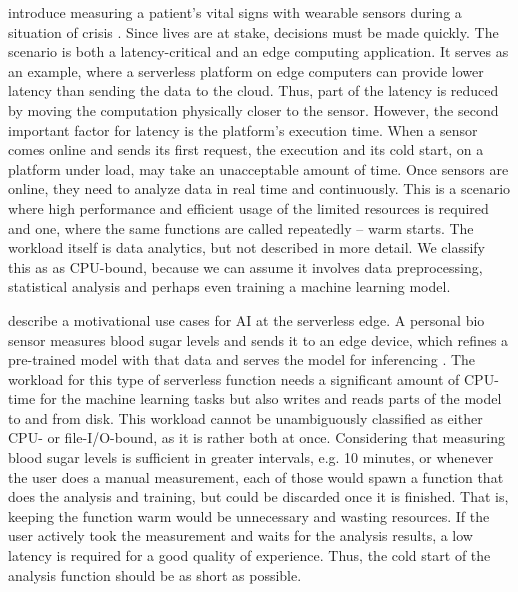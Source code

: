 

\begin{description}[style=multiline, leftmargin=2.5cm, font=\bfseries]

    \item[Vital Signs Analysis] \citeauthor{Nastic2017} introduce measuring a patient's vital signs with wearable sensors during a situation of crisis \cite{Nastic2017}. Since lives are at stake, decisions must be made quickly. The scenario is both a latency-critical and an edge computing application. It serves as an example, where a serverless platform on edge computers can provide lower latency than sending the data to the cloud. Thus, part of the latency is reduced by moving the computation physically closer to the sensor. However, the second important factor for latency is the platform's execution time. When a sensor comes online and sends its first request, the execution and its cold start, on a platform under load, may take an unacceptable amount of time. Once sensors are online, they need to analyze data in real time and continuously. This is a scenario where high performance and efficient usage of the limited resources is required and one, where the same functions are called repeatedly -- warm starts.
    The workload itself is data analytics, but not described in more detail. We classify this as as CPU-bound, because we can assume it involves data preprocessing, statistical analysis and perhaps even training a machine learning model.

    \item[Edge AI] \citeauthor{Rausch2019} describe a motivational use cases for AI at the serverless edge. A personal bio sensor measures blood sugar levels and sends it to an edge device, which refines a pre-trained model with that data and serves the model for inferencing \cite{Rausch2019}. The workload for this type of serverless function needs a significant amount of CPU-time for the machine learning tasks but also writes and reads parts of the model to and from disk. This workload cannot be unambiguously classified as either CPU- or file-I/O-bound, as it is rather both at once. Considering that measuring blood sugar levels is sufficient in greater intervals, e.g. 10 minutes, or whenever the user does a manual measurement, each of those would spawn a function that does the analysis and training, but could be discarded once it is finished. That is, keeping the function warm would be unnecessary and wasting resources. If the user actively took the measurement and waits for the analysis results, a low latency is required for a good quality of experience. Thus, the cold start of the analysis function should be as short as possible.
    

\end{description}
